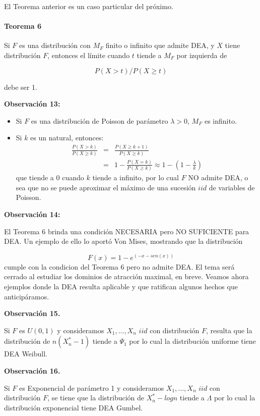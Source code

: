 \documentclass[
  oneside]{book}
\begin{document}
El Teorema anterior es un caso particular del próximo.

\hypertarget{teorema-6}{%
\paragraph{Teorema 6}\label{teorema-6}}

Si \(F\) es una distribución con \(M_F\) finito o infinito que admite
DEA, y \(X\) tiene distribución \(F\), entonces el límite cuando \(t\)
tiende a \(M_F\) por izquierda de

\[P(X>t)/P(X \geq t)\]

debe ser 1.

\textbf{Observación 13:}

\begin{itemize}
\item Si $F$ es una distribución de Poisson de parámetro $\lambda>0$, $M_F$ es infinito. 
\item Si $k$ es un natural, entonces:
\begin{eqnarray}
\frac{P(X>k)}{P(X\geq k)} &=& \frac{P(X \geq k+1)}{P(X\geq k)} \\ \nonumber
&=& 1-\frac{P(X=k)}{P(X \geq k)} \approx 1-\left(1- \frac{\lambda}{k}\right) 
\end{eqnarray}
que tiende a $0$ cuando $k$ tiende a infinito, por lo cual $F$ NO admite DEA, o sea que no se puede aproximar el máximo de una sucesión $iid$ de variables de Poisson.
\end{itemize}

\textbf{Observación 14:}

El Teorema 6 brinda una condición NECESARIA pero NO SUFICIENTE para DEA.
Un ejemplo de ello lo aportó Von Mises, mostrando que la distribución

\[F(x)= 1- e^{(-x-sen(x))}\] cumple con la condicion del Teorema 6 pero
no admite DEA. El tema será cerrado al estudiar los dominios de
atracción maximal, en breve. Veamos ahora ejemplos donde la DEA resulta
aplicable y que ratifican algunos hechos que anticipáramos.

\textbf{Observación 15.}

Si \(F\) es \(U(0,1)\) y consideramos \(X_1,...,X_n\) \(iid\) con
distribución \(F\), resulta que la distribución de \(n( X_n^*- 1)\)
tiende a \(\Psi_1\) por lo cual la distribución uniforme tiene DEA
Weibull.

\textbf{Observación 16.}

Si \(F\) es Exponencial de parámetro 1 y consideramos \(X_1,...,X_n\)
\(iid\) con distribución \(F\), se tiene que la distribución de
\(X_n^*- log n\) tiende a \(\Lambda\) por lo cual la distribución
exponencial tiene DEA Gumbel.
\end{document}
